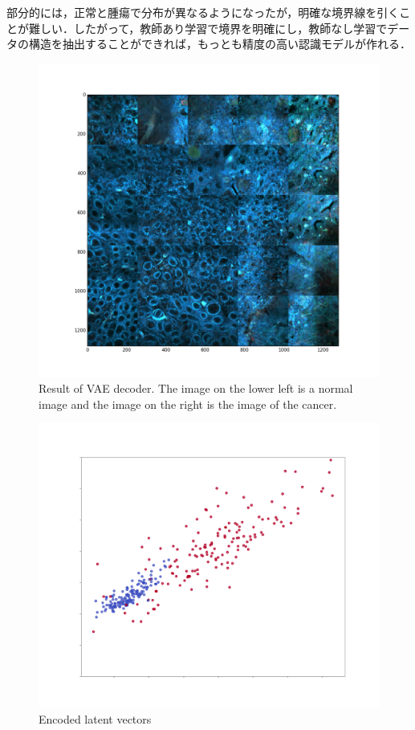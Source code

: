 部分的には，正常と腫瘍で分布が異なるようになったが，明確な境界線を引くことが難しい．したがって，教師あり学習で境界を明確にし，教師なし学習でデータの構造を抽出することができれば，もっとも精度の高い認識モデルが作れる．

\begin{figure}[H]
	\centering
	\includegraphics[width=\linewidth]{fig/chapter4/vae_result_picture}
	\caption{Result of VAE decoder. The image on the lower left is a normal image and the image on the right is the image of the cancer.}
	\label{fig:vaeresultpicture}
\end{figure}

\begin{figure}
	\centering
	\includegraphics[width=0.7\linewidth]{fig/chapter4/vae_latent_vectors}
	\caption{Encoded latent vectors}
	\label{fig:vaelatentvectors}
\end{figure}


